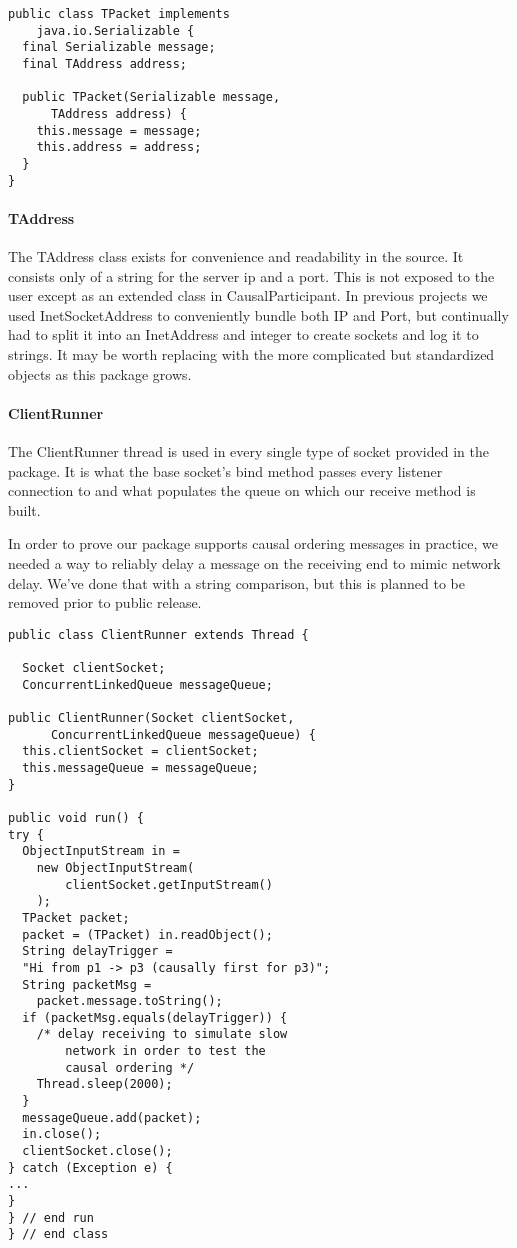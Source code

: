 \documentclass[11pt,journal,compsoc]{IEEEtran}
\begin{document}
\begin{lstlisting}
public class TPacket implements
    java.io.Serializable {
  final Serializable message;
  final TAddress address;

  public TPacket(Serializable message,
      TAddress address) {
    this.message = message;
    this.address = address;
  }
}
\end{lstlisting}

\paragraph{TAddress}
The TAddress class exists for convenience and readability in the source. It consists only of a string for the server ip and a port. This is not exposed to the user except as an extended class in CausalParticipant. In previous projects we used InetSocketAddress to conveniently bundle both IP and Port, but continually had to split it into an InetAddress and integer to create sockets and log it to strings. It may be worth replacing with the more complicated but standardized objects as this package grows.

\paragraph{ClientRunner}
The ClientRunner thread is used in every single type of socket provided in the package. It is what the base socket's bind method passes every listener connection to and what populates the queue on which our receive method is built.

In order to prove our package supports causal ordering messages in practice, we needed a way to reliably delay a message on the receiving end to mimic network delay. We've done that with a string comparison, but this is planned to be removed prior to public release.


\begin{lstlisting}
public class ClientRunner extends Thread {

  Socket clientSocket;
  ConcurrentLinkedQueue messageQueue;

public ClientRunner(Socket clientSocket,
      ConcurrentLinkedQueue messageQueue) {
  this.clientSocket = clientSocket;
  this.messageQueue = messageQueue;
}

public void run() {
try {
  ObjectInputStream in =
    new ObjectInputStream(
        clientSocket.getInputStream()
    );
  TPacket packet;
  packet = (TPacket) in.readObject();
  String delayTrigger =
  "Hi from p1 -> p3 (causally first for p3)";
  String packetMsg =
    packet.message.toString();
  if (packetMsg.equals(delayTrigger)) {
    /* delay receiving to simulate slow
        network in order to test the
        causal ordering */
    Thread.sleep(2000);
  }
  messageQueue.add(packet);
  in.close();
  clientSocket.close();
} catch (Exception e) {
...
}
} // end run
} // end class



\end{lstlisting}
\end{document}
